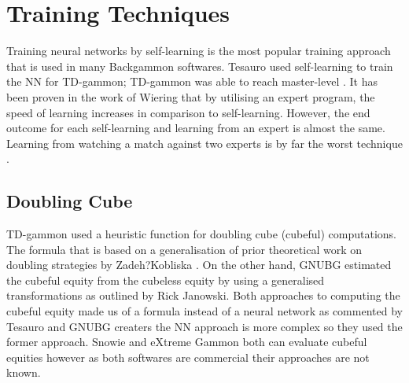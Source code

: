 \documentclass[12pt,a4paper]{article}
\begin{document}
\section*{Training Techniques}
Training neural networks by self-learning is the most popular training approach that is used in many Backgammon softwares. Tesauro used self-learning to train the NN for TD-gammon; TD-gammon was able to reach master-level \cite{DBLP:conf/icml/Tesauro92}. It has been proven in the work of Wiering \cite{DBLP:journals/jilsa/Wiering10} that by utilising an expert program, the speed of learning increases in comparison to self-learning. However, the end outcome for each self-learning and learning from an expert is almost the same. Learning from watching a match against two experts is by far the worst technique \cite{DBLP:journals/jilsa/Wiering10}.
\subsection*{Doubling Cube}
TD-gammon used a heuristic function for doubling cube (cubeful) computations. The formula that is based on a generalisation of prior theoretical work on doubling strategies by Zadeh?Kobliska \cite{DBLP:journals/ai/Tesauro02}. On the other hand, GNUBG estimated the cubeful equity from the cubeless equity by using a generalised transformations as outlined by Rick Janowski. Both approaches to computing the cubeful equity made us of a formula instead of a neural network as commented by Tesauro and GNUBG creaters the NN approach is more complex so they used the former approach. Snowie \cite{snowie} and eXtreme Gammon \cite{exg} both can evaluate cubeful equities however as both softwares are commercial their approaches are not known.
\end{document}
